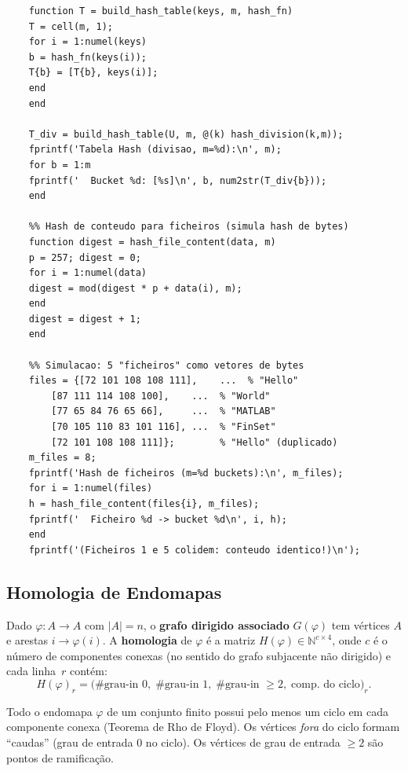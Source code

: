 \begin{lstlisting}[style=matlab, caption={Tabela hash com encadeamento e aplicação a ficheiros}]
	%% Tabela Hash com Encadeamento (Chaining)
	function T = build_hash_table(keys, m, hash_fn)
	T = cell(m, 1);
	for i = 1:numel(keys)
	b = hash_fn(keys(i));
	T{b} = [T{b}, keys(i)];
	end
	end
	
	T_div = build_hash_table(U, m, @(k) hash_division(k,m));
	fprintf('Tabela Hash (divisao, m=%d):\n', m);
	for b = 1:m
	fprintf('  Bucket %d: [%s]\n', b, num2str(T_div{b}));
	end
	
	%% Hash de conteudo para ficheiros (simula hash de bytes)
	function digest = hash_file_content(data, m)
	p = 257; digest = 0;
	for i = 1:numel(data)
	digest = mod(digest * p + data(i), m);
	end
	digest = digest + 1;
	end
	
	%% Simulacao: 5 "ficheiros" como vetores de bytes
	files = {[72 101 108 108 111],    ...  % "Hello"
		[87 111 114 108 100],    ...  % "World"
		[77 65 84 76 65 66],     ...  % "MATLAB"
		[70 105 110 83 101 116], ...  % "FinSet"
		[72 101 108 108 111]};        % "Hello" (duplicado)
	m_files = 8;
	fprintf('Hash de ficheiros (m=%d buckets):\n', m_files);
	for i = 1:numel(files)
	h = hash_file_content(files{i}, m_files);
	fprintf('  Ficheiro %d -> bucket %d\n', i, h);
	end
	fprintf('(Ficheiros 1 e 5 colidem: conteudo identico!)\n');
\end{lstlisting}

\subsection{Homologia de Endomapas}

\begin{definition}
	Dado $\varphi: A \to A$ com $|A| = n$, o
	\textbf{grafo dirigido associado} $G(\varphi)$ tem vértices
	$A$ e arestas $i \to \varphi(i)$.
	A \textbf{homologia} de $\varphi$ é a matriz
	$H(\varphi) \in \mathbb{N}^{c \times 4}$,
	onde $c$ é o número de componentes conexas (no sentido do
	grafo subjacente não dirigido) e cada linha~$r$ contém:
	\begin{equation}
		H(\varphi)_{r} = \bigl(\#\text{grau-in }0,\;
		\#\text{grau-in }1,\;
		\#\text{grau-in }\geq 2,\;
		\text{comp.\ do ciclo}\bigr)_r.
		\label{eq:homology}
	\end{equation}
\end{definition}

\begin{remark}
	Todo o endomapa $\varphi$ de um conjunto finito possui pelo
	menos um ciclo em cada componente conexa (Teorema de Rho de
	Floyd). Os vértices \emph{fora} do ciclo formam ``caudas''
	(grau de entrada 0 no ciclo). Os vértices de grau de entrada
	$\geq 2$ são pontos de ramificação.
\end{remark}

